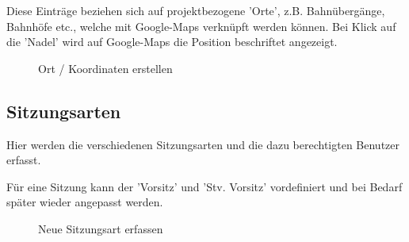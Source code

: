 Diese Einträge beziehen sich auf projektbezogene 'Orte', z.B. Bahnübergänge, Bahnhöfe etc., welche mit Google-Maps verknüpft werden können. Bei Klick auf die 'Nadel' wird auf Google-Maps die Position beschriftet angezeigt.

\begin{figure}[H]
\caption{Ort / Koordinaten erstellen}
\end{figure}

\clearpage
\subsection{Sitzungsarten}

Hier werden die verschiedenen Sitzungsarten und die dazu berechtigten Benutzer erfasst.

\vspace{\baselineskip}


Für eine Sitzung kann der 'Vorsitz' und 'Stv. Vorsitz' vordefiniert und bei Bedarf später wieder angepasst
werden.

\begin{figure}[H]
\caption{Neue Sitzungsart erfassen}
\end{figure}

